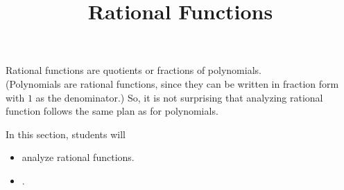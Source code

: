 \documentclass{ximera}
\title{Rational Functions}
\begin{document}
\begin{abstract}
\end{abstract}
\maketitle












Rational functions are quotients or fractions of polynomials.  \\


(Polynomials are rational functions, since they can be written in fraction form with $1$ as the denominator.)  So, it is not surprising that analyzing rational function follows the same plan as for polynomials.




























\begin{sectionOutcomes}
In this section, students will 

\begin{itemize}
\item analyze rational functions.
\item .
\end{itemize}
\end{sectionOutcomes}
\end{document}
